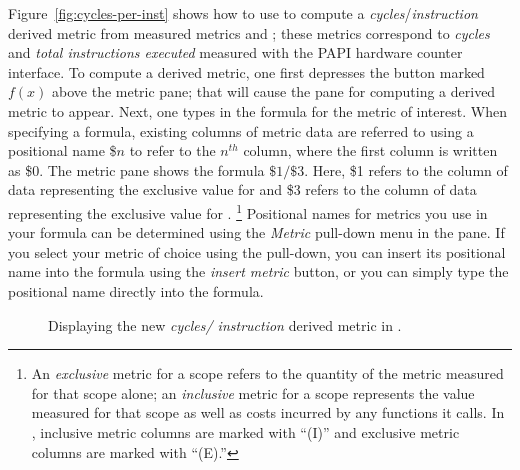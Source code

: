 \documentclass[11pt,letterpaper]{report}
\begin{document}
Figure~\ref{fig:cycles-per-inst} shows how to use \hpcviewer{} to compute a \emph{cycles}/\emph{instruction} derived metric from measured metrics  and ; these metrics correspond to {\em cycles} and {\em total instructions executed} measured with the PAPI hardware counter interface.
To compute a derived metric, one first depresses the button marked $f(x)$ above the metric pane; that will cause the pane for computing a derived metric to appear.
Next, one types in the formula for the metric of interest.
When specifying a formula, existing columns of metric data are referred to using a positional name \$$n$ to refer to the $n^{th}$ column, where the first column is written as \$0.
The metric pane shows the formula $\$1/\$3$.
Here, \$1 refers to the column of data representing the exclusive value for  and \$3 refers to the column of data representing the exclusive value for .%
\footnote{An {\em exclusive} metric for a scope refers to the quantity of the metric measured for that scope alone; an \emph{inclusive} metric for a scope represents the value measured for that scope as well as costs incurred by any functions it calls. In \hpcviewer{}, inclusive metric columns are marked with ``(I)'' and exclusive metric columns are marked with ``(E).''}
Positional names for metrics you use in your formula can be determined using the \emph{Metric} pull-down menu in the pane.
If you select your metric of choice using the pull-down, you can insert its positional name into the formula using the {\em insert metric} button, or you can simply type the positional name directly into the formula.

\begin{figure}[t]
\caption{Displaying the new {\em cycles/ instruction} derived metric in \hpcviewer{}.}
\label{fig:cycles-per-inst-2}
\end{figure}
\end{document}
